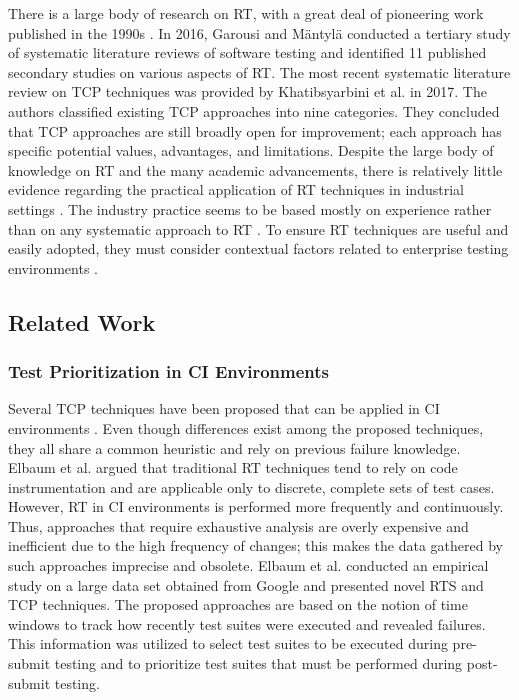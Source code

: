 \documentclass[1p]{elsarticle}
\begin{document}
There is a large body of research on RT, with a great deal of pioneering work published in the 1990s \cite{harrold1993methodology,rothermel1996analyzing,rothermel1998empirical,rothermel1999test}. In 2016, Garousi and M\"{a}ntyl\"{a} \cite{garousi2016systematic} conducted a tertiary study of systematic literature reviews of software testing and identified 11 published secondary studies on various aspects of RT. The most recent systematic literature review on TCP techniques was provided by Khatibsyarbini et al. \cite{khatibsyarbini2017test} in 2017. The authors classified existing TCP approaches into nine categories. They concluded that TCP approaches are still broadly open for improvement; each approach has specific potential values, advantages, and limitations. Despite the large body of knowledge on RT and the many academic advancements, there is relatively little evidence regarding the practical application of RT techniques in industrial settings \cite{orso2014software}. The industry practice seems to be based mostly on experience rather than on any systematic approach to RT \cite{engstrom2010qualitative}. To ensure RT techniques are useful and easily adopted, they must consider contextual factors related to enterprise testing environments \cite{do2016chapter}.


\subsection{Related Work}

\subsubsection{Test Prioritization in CI Environments}

Several TCP techniques have been proposed that can be applied in CI environments \cite{kim2002history,elbaum2014techniques,marijan2013test,strandberg2016experience,srikanth2016test,hemmati2017prioritizing,spieker2017reinforcement}. Even though differences exist among the proposed techniques, they all share a common heuristic and rely on previous failure knowledge. Elbaum et al. \cite{elbaum2014techniques} argued that traditional RT techniques tend to rely on code instrumentation and are applicable only to discrete, complete sets of test cases. However, RT in CI environments is performed more frequently and continuously. Thus, approaches that require exhaustive analysis are overly expensive and inefficient due to the high frequency of changes; this makes the data gathered by such approaches imprecise and obsolete. Elbaum et al. \cite{elbaum2014techniques} conducted an empirical study on a large data set obtained from Google and presented novel RTS and TCP techniques. The proposed approaches are based on the notion of time windows to track how recently test suites were executed and revealed failures. This information was utilized to select test suites to be executed during pre-submit testing and to prioritize test suites that must be performed during post-submit testing.
\end{document}
